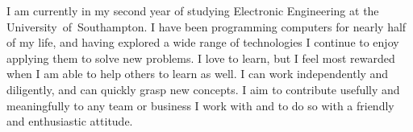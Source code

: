 
I am currently in my second year of studying Electronic Engineering at the \mbox{University of Southampton}. I have been programming computers for nearly half of my life, and having explored a wide range of technologies I continue to enjoy applying them to solve new problems. I love to learn, but I feel most rewarded when I am able to help others to learn as well. I can work independently and diligently, and can quickly grasp new concepts. I aim to contribute usefully and meaningfully to any team or business I work with and to do so with a friendly and enthusiastic attitude.
